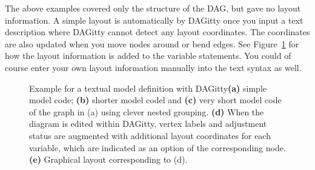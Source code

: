 \documentclass[a4paper]{article} %
\newcommand{\pp}{{\sc DAG}itty\xspace}
\begin{document}
The above examples covered only the structure of the DAG, but gave no layout information. A simple layout is automatically by \pp once you input a text description where \pp cannot detect any layout coordinates. The coordinates are also updated when you move nodes around or bend edges. See Figure~\ref{fig:syntax} for how the layout information is added to the variable statements. You could of course enter your own layout information manually into the text syntax as well.
\begin{figure}
\caption{
Example for a textual model definition with \pp {\bfseries (a)} simple model code; 
{\bfseries (b)} shorter model codel
and {\bfseries (c)} very short model code of the graph in (a) using 
clever nested grouping. {\bfseries (d)} When the diagram is edited within \pp, vertex labels 
and adjustment status are augmented with additional layout coordinates
for each variable, which are indicated as an option of the corresponding node.
{\bfseries (e)} Graphical layout corresponding to (d).
}
\label{fig:syntax}
\end{figure}
\end{document}
